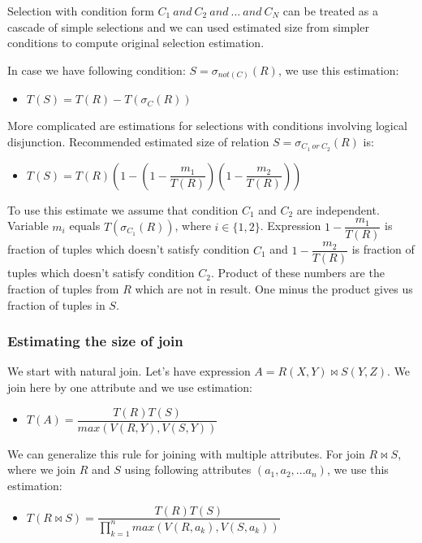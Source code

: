 Selection with condition form $C_1~and~C_2~and~...~and~C_N$ can be treated as a cascade of simple selections and we can used estimated size from simpler conditions to compute original selection estimation.

In case we have following condition: $S=\sigma_{not(C)}(R)$, we use this estimation:
\begin{itemize}
\item $T(S)=T(R)-T(\sigma_C(R))$
\end{itemize}

More complicated are estimations for selections with conditions involving logical disjunction. Recommended estimated size of relation $S=\sigma_{C_1~or~C_2}(R)$ is:

\begin{itemize}
\item $T(S)=T(R)(1-(1-\dfrac{m_1}{T(R)})(1-\dfrac{m_2}{T(R)}))$
\end{itemize}

To use this estimate we assume that condition $C_1$ and $C_2$ are independent.
Variable $m_i$ equals $T(\sigma_{C_1}(R))$, where $i\in\{1,2\}$. Expression $1-\dfrac{m_1}{T(R)}$ is fraction of tuples which doesn't satisfy condition $C_1$ and $1-\dfrac{m_2}{T(R)}$ is fraction of tuples which doesn't satisfy condition $C_2$. Product of these numbers are the fraction of tuples from $R$ which are not in result. One minus the product gives us fraction of tuples in $S$.

\subsubsection{Estimating the size of join}
\label{join}
We start with natural join. Let's have expression $A=R(X,Y)\Join S(Y,Z)$. We join here by one attribute and we use estimation:

\begin{itemize}
\item $T(A)=\dfrac{T(R)T(S)}{max(V(R,Y),V(S,Y))}$
\end{itemize}

We can generalize this rule for joining with multiple attributes. For join $R\Join S$, where we join $R$ and $S$ using following attributes $(a_1,a_2,...a_n)$, we use this estimation:

\begin{itemize}
\item $T(R\Join S)=\dfrac{T(R)T(S)}{\prod_{k=1}^{n}{max(V(R,a_k),V(S,a_k))}}$
\end{itemize}

